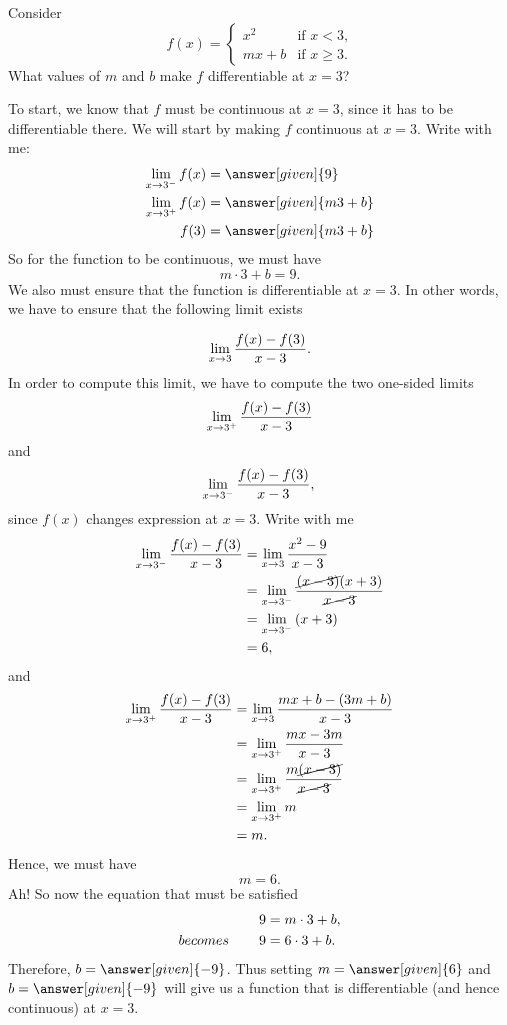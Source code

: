 \documentclass{ximera}
\begin{document}
\begin{example}
  Consider
  \[
  f(x) = \begin{cases}
          x^2 &\text{if $x<3$,}\\
          mx+b &\text{if $x\ge 3$.}
         \end{cases}
  \]
  What values of $m$ and $b$ make $f$ differentiable at $x=3$?
  \begin{explanation}
    To start, we know that  $f$ must be continuous at $x=3$, since it has to be
    differentiable there. We will start by making $f$  continuous at
    $x=3$. Write with me:
    \begin{align*}
      \lim_{x\to 3^-} f(x) &= \answer[given]{9}\\
      \lim_{x\to 3^+} f(x) &= \answer[given]{m 3 + b}\\
      f(3) &= \answer[given]{m 3 + b}
    \end{align*}
    So for the function to be continuous, we must have
    \[
    m\cdot 3 + b =9.
    \]
    We also must ensure that the function is differentiable at $x=3$. In other words, we have to ensure that the following limit exists

 \[
 \lim_{x\to 3}\frac{f(x)-f(3)}{x-3}.\\
\]
In order to compute this limit, we have to compute the two one-sided limits
 \[
 \lim_{x\to 3^{+}}\frac{f(x)-f(3)}{x-3}\\
\]
and
\[
 \lim_{x\to 3^{-}}\frac{f(x)-f(3)}{x-3},\\
\]
since  $f(x)$ changes expression at $x=3$.
Write with me
     \begin{align*}
        \lim_{x\to 3^{-}}\frac{f(x)-f(3)}{x-3}&= \lim_{x\to 3}\frac{x^2 -9}{x-3}\\
      &= \lim_{x\to 3^{-}}\frac{\cancel{(x-3)}(x+3)}{\cancel{x-3}}\\
      &= \lim_{x\to 3^{-}}\left(x+3\right)\\
      &=6,
    \end{align*}
    and
   \begin{align*}
        \lim_{x\to 3^{+}}\frac{f(x)-f(3)}{x-3}&= \lim_{x\to 3}\frac{mx+b -(3m+b)}{x-3}\\
          &= \lim_{x\to 3^{+}}\frac{mx-3m}{x-3}\\
      &= \lim_{x\to 3^{+}}\frac{m\cancel{(x-3)}}{\cancel{x-3}}\\
      &= \lim_{x\to 3^{+}}m\\
      &=m.
    \end{align*}
    Hence, we must have
   \[
      m=6.
  \]
    Ah! So now the equation that must be satisfied
    \begin{align*}
      9 &= m\cdot 3 + b,\\
    becomes\hspace{0.3in}  9 &= 6\cdot 3 + b.\\
    \end{align*}
   Therefore, $b=\answer[given]{-9}$. Thus setting $m=\answer[given]{6}$ and
    $b=\answer[given]{-9}$ will give us a function that is differentiable (and hence
    continuous) at $x=3$.
   
  \end{explanation}
\end{example}
\end{document}
